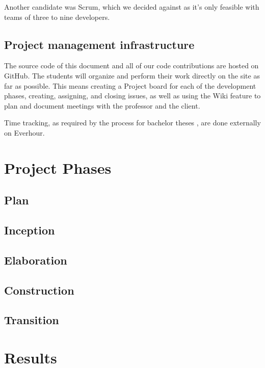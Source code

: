 Another candidate was Scrum, which we decided against as it’s only feasible
with teams of three to nine developers.

\section{Project management infrastructure}
The source code of this document and all of our code contributions are hosted
on GitHub. The students will organize and perform their work directly on the
site as far as possible. This means creating a Project board for each of the
development phases, creating, assigning, and closing issues, as well as using
the Wiki feature to plan and document meetings with the professor and the
client.

Time tracking, as required by the process for bachelor theses
\cite{hsr:thesis-rules}, are done externally on Everhour.


\chapter{Project Phases}


\section{Plan}

\section{Inception}

\section{Elaboration}

\section{Construction}

\section{Transition}

\chapter{Results}
